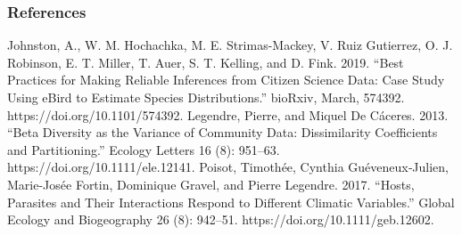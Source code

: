 \documentclass[10pt]{beamer}
\begin{document}
\begin{frame}
  \frametitle{References}
  Johnston, A., W. M. Hochachka, M. E. Strimas-Mackey, V. Ruiz Gutierrez, O. J. Robinson, E. T. Miller, T. Auer, S. T. Kelling, and D. Fink. 2019. “Best Practices for Making Reliable Inferences from Citizen Science Data: Case Study Using eBird to Estimate Species Distributions.” bioRxiv, March, 574392. https://doi.org/10.1101/574392.
  \vfill
  Legendre, Pierre, and Miquel De Cáceres. 2013. “Beta Diversity as the Variance of Community Data: Dissimilarity Coefficients and Partitioning.” Ecology Letters 16 (8): 951–63. https://doi.org/10.1111/ele.12141.
  \vfill
  Poisot, Timothée, Cynthia Guéveneux‐Julien, Marie-Josée Fortin, Dominique Gravel, and Pierre Legendre. 2017. “Hosts, Parasites and Their Interactions Respond to Different Climatic Variables.” Global Ecology and Biogeography 26 (8): 942–51. https://doi.org/10.1111/geb.12602.
\end{frame}
\end{document}
